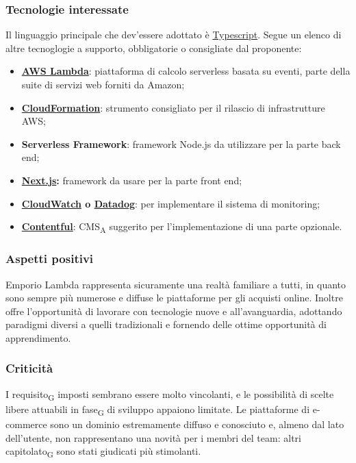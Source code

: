\subsubsection{Tecnologie interessate}

Il linguaggio principale che dev'essere adottato è \href{https://www.typescriptlang.org/}{Typescript}. Segue un elenco di altre tecnoglogie a supporto, obbligatorie o consigliate dal proponente:
\begin{itemize}
    \item \textbf{\href{https://aws.amazon.com/it/lambda/}{AWS Lambda}}: piattaforma di calcolo serverless basata su eventi, parte della suite di servizi web forniti da Amazon;
    \item \textbf{\href{https://aws.amazon.com/it/cloudformation/}{CloudFormation}}: strumento consigliato per il rilascio di infrastrutture AWS;
    \item \textbf{Serverless Framework}: framework Node.js da utilizzare per la parte back end;
    \item \textbf{\href{https://nextjs.org/}{Next.js}:} framework da usare per la parte front end;
    \item \textbf{\href{https://aws.amazon.com/it/cloudwatch/}{CloudWatch} o \href{https://www.datadoghq.com/}{Datadog}}: per implementare il sistema di monitoring;
    \item \textbf{\href{https://www.contentful.com/}{Contentful}}: CMS\textsubscript{A} suggerito per l'implementazione di una parte opzionale.
\end{itemize}


\subsubsection{Aspetti positivi}

Emporio Lambda rappresenta sicuramente una realtà familiare a tutti, in quanto sono sempre più numerose e diffuse le piattaforme per gli acquisti online. Inoltre offre l'opportunità di lavorare con tecnologie nuove e all'avanguardia, adottando paradigmi diversi a quelli tradizionali e fornendo delle ottime opportunità di apprendimento.


\subsubsection{Criticità}

I requisito\textsubscript{G} imposti sembrano essere molto vincolanti, e le possibilità di scelte libere attuabili in fase\textsubscript{G} di sviluppo appaiono limitate. Le piattaforme di e-commerce sono un dominio estremamente diffuso e conosciuto e, almeno dal lato dell'utente, non rappresentano una novità per i membri del team: altri capitolato\textsubscript{G} sono stati giudicati più stimolanti.


